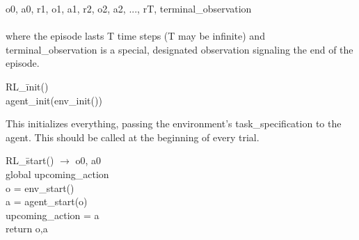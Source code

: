 \documentclass[11pt]{article}
\begin{document}
o0, a0,  r1, o1, a1,  r2, o2, a2, ..., rT, terminal\_observation
\\\\
where the episode lasts T time steps (T may be infinite) and terminal\_observation is a special, designated observation signaling the end of the episode.
\begin{tabbing}
RL\_\=init() \\
\>agent\_init(env\_init())
\end{tabbing}
This initializes everything, passing the environment's task\_specification to the agent. This should be called at the beginning of every trial.
\begin{tabbing}
RL\_\=start() $\rightarrow$ o0, a0\\
\>global upcoming\_action\\
\>o = env\_start()\\
\>a = agent\_start(o)\\
\>upcoming\_action = a\\
return o,a
\end{tabbing}
\end{document}
